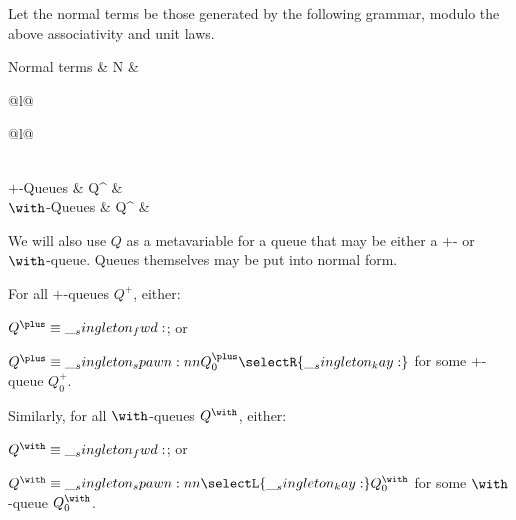 Let the normal terms be those generated by the following grammar, modulo the above associativity and unit laws.
\begin{syntax*}
  Normal terms & N &
    \begin{array}[t]{@{}l@{}}
       \mid {} \mid \fwd \\
        \begin{array}[t]{@{\mathllap{\mid {}}}l@{}}
           \\
        \end{array}
    \end{array}
  \\
  $\plus$-Q{ueues} & Q^{\plus} &
    \fwd \mid {} \mid \selectR{\kay}
  \\
  $\with$-Q{ueues} & Q^{\with} &
    \fwd \mid {} \mid \selectL{\kay}
\end{syntax*}

We will also use $Q$ as a metavariable for a queue that may be either a $\plus$- or $\with$-queue.
Queues themselves may be put into normal form.
\begin{lemma}
  For all $\plus$-queues $Q^{\plus}$, either:
  \begin{enumerate*}[label=\emph{(\roman*)}]
  \item $Q^{\plus} \equiv \fwd$; or
  \item $Q^{\plus} \equiv \spawn{Q^{\plus}_0}{\selectR{\kay}}$ for some $\plus$-queue $Q^{\plus}_0$.
  \end{enumerate*}
  Similarly, for all $\with$-queues $Q^{\with}$, either:
  \begin{enumerate*}[label=\emph{(\roman*)}]
  \item $Q^{\with} \equiv \fwd$; or
  \item $Q^{\with} \equiv \spawn{\selectL{\kay}}{Q^{\with}_0}$ for some $\with$-queue $Q^{\with}_0$.
  \end{enumerate*}
\end{lemma}

